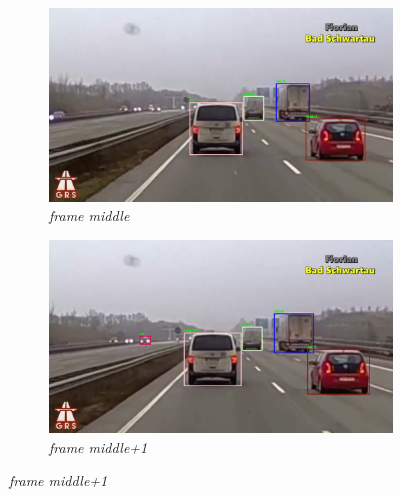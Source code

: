 \documentclass[11pt,a4paper]{article}
\begin{document}
\begin{figure}[!h]
\begin{subfigure}[b]{0.48\textwidth}
\includegraphics[width=\textwidth]{10}
\caption{\textit{frame middle}}
\end{subfigure}
\label{fig:middle_0}
\hfill
\begin{subfigure}[b]{0.48\textwidth}
\includegraphics[width=\textwidth]{11}
\caption{\textit{frame middle+1}}
\end{subfigure}
\label{fig:middle_1}



\end{figure}
\end{document}
